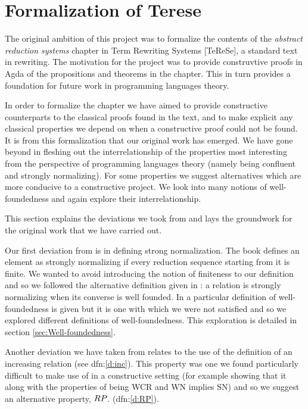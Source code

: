 \section{Formalization of Terese}
\label{sec:Formalization}
The original ambition of this project was to formalize the contents of the \emph{abstract reduction 
systems} chapter in Term Rewriting Systems [TeReSe], a standard text in rewriting. 
The motivation for the project was to provide construvtive proofs in Agda 
of the propositions and theorems in the chapter. This in turn provides a foundation for 
future work in programming languages theory. 

In order to formalize the chapter we have aimed to provide constructive counterparts to the 
classical proofs found in the text, and to make explicit any classical properties we depend 
on when a constructive proof could not be found. It is from this formalization that our 
original work has emerged. We have gone beyond \terese in fleshing out the interrelationship 
of the properties most interesting from the perspective of programming languages theory (namely 
being confluent and strongly normalizing). 
For some properties we suggest alternatives which are more conducive to a constructive project. 
We look into many notions of well-foundedness and again explore their interrelationship. 

This section explains the deviations we took from \terese and lays the groundwork for the original work 
that we have carried out. 


Our first deviation from \terese is in defining strong normalization. The book defines 
an element as strongly normalizing if every reduction sequence starting from it is finite. 
We wanted to avoid introducing the notion of finiteness to our definition and so we 
followed the alternative definition given in \terese : a relation is strongly normalizing when its 
converse is well founded. In \terese a particular definition of well-foundedness is given but 
it is one with which we were not satisfied and so we explored different definitions of 
well-foundedness. This exploration is detailed in section \ref{sec:Well-foundedness}. 

Another deviation we have taken from \terese relates to the use of the definition of an 
increasing relation (see dfn:\ref{d:inc}). This property was one we found particularly difficult 
to make use of in a constructive setting (for example showing that it along with the properties 
of being WCR and WN implies SN) and so we suggest an alternative property, $\RP$.
(dfn:\ref{d:RP}). 

